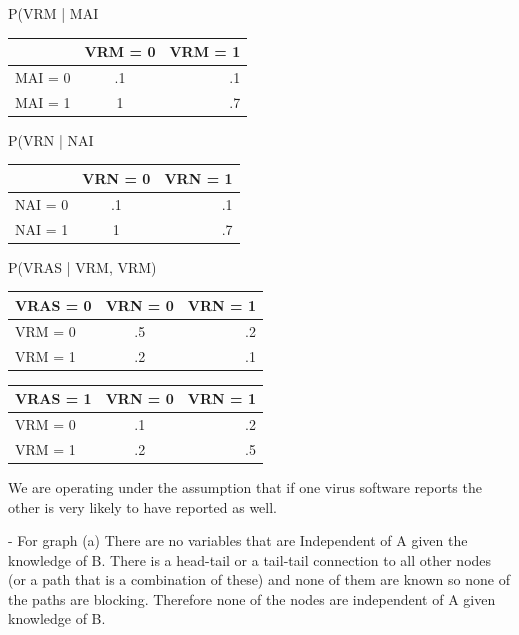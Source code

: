 \documentclass[solution, letterpaper]{cs121}
\begin{document}
\begin{empfile}
\begin{center}
\begin{emp}
\end{emp}
\end{center}

P(VRM | MAI\\
\begin{center}
\begin{tabular}{ l |c r }
   & VRM = 0 & VRM = 1 \\
   \hline
  MAI = 0 & .1 & .1 \\
  MAI = 1 & 1 & .7 \\
\end{tabular}
\end{center}


P(VRN | NAI\\
\begin{center}
\begin{tabular}{ l |c r }
   & VRN = 0 & VRN = 1 \\
   \hline
  NAI = 0 & .1 & .1 \\
  NAI = 1 & 1 & .7 \\
\end{tabular}
\end{center}


P(VRAS | VRM, VRM)\\
\begin{center}
\begin{tabular}{ l |c r }
   VRAS = 0 & VRN = 0& VRN = 1 \\
   \hline
  VRM = 0 & .5 & .2 \\
  VRM = 1 & .2 & .1 \\
\end{tabular}
\end{center}

\begin{center}
\begin{tabular}{ l |c r }
   VRAS = 1 & VRN = 0 & VRN = 1 \\
   \hline
  VRM = 0 & .1 & .2 \\
  VRM = 1 & .2 & .5 \\
\end{tabular}
\end{center}
We are operating under the assumption that if one virus software reports the other is very likely to have reported as well.

\subproblem 
- For graph (a) There are no variables that are Independent of A given the knowledge of B. There is a head-tail or a tail-tail connection to all other nodes (or a path that is a combination of these) and none of them are known so none of the paths are blocking. Therefore none of the nodes are independent of A given knowledge of B.\\


\end{empfile}
\end{document}
